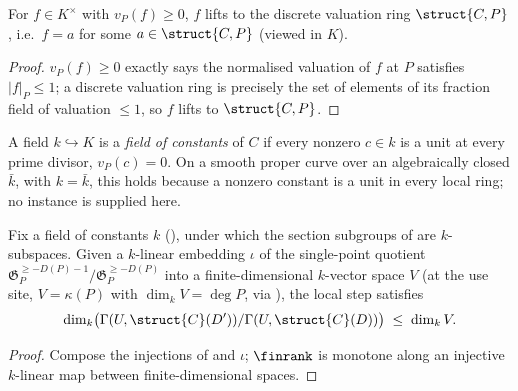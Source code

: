 \begin{lemma}
  \label{lem:adelic_order_stalk_integral}
  \leanok
  For \(f \in K^\times\) with \(v_P(f) \ge 0\), \(f\) lifts to the
  discrete valuation ring \(\struct{C, P}\), i.e.\ \(f = a\) for some
  \(a \in \struct{C, P}\) (viewed in \(K\)).
\end{lemma}
\begin{proof}
  \leanok
  \(v_P(f) \ge 0\) exactly says the normalised valuation of \(f\) at
  \(P\) satisfies \(|f|_P \le 1\); a discrete valuation ring is
  precisely the set of elements of its fraction field of valuation
  \(\le 1\), so \(f\) lifts to \(\struct{C, P}\).
\end{proof}

\begin{definition}
  \label{def:adelic_constant_field_gate}
  \notready  %
  A field \(k \hookrightarrow K\) is a \emph{field of constants} of
  \(C\) if every nonzero \(c \in k\) is a unit at every prime divisor,
  \(v_P(c) = 0\). On a smooth proper curve over an algebraically closed
  \(\bar k\), with \(k = \bar k\), this holds because a nonzero constant
  is a unit in every local ring; no instance is supplied here.
\end{definition}

\begin{theorem}
  \label{thm:adelic_local_step_dim_le_residue_degree}
  \leanok
  Fix a field of constants \(k\) (),
  under which the section subgroups of
   are \(k\)-subspaces. Given a
  \(k\)-linear embedding \(\iota\) of the single-point quotient
  \(\mathfrak G_P^{\ge -D(P)-1}/\mathfrak G_P^{\ge -D(P)}\) into a
  finite-dimensional \(k\)-vector space \(V\) (at the use site,
  \(V = \kappa(P)\) with \(\dim_k V = \deg P\), via
  ), the local step satisfies
  \[
    \dim_k \bigl(\Gamma(U, \struct{C}(D'))/\Gamma(U, \struct{C}(D))\bigr)
      \;\le\; \dim_k V.
  \]
\end{theorem}
\begin{proof}
  \leanok
  Compose the injections of  and
  \(\iota\); \(\finrank\) is monotone along an injective \(k\)-linear
  map between finite-dimensional spaces.
\end{proof}

